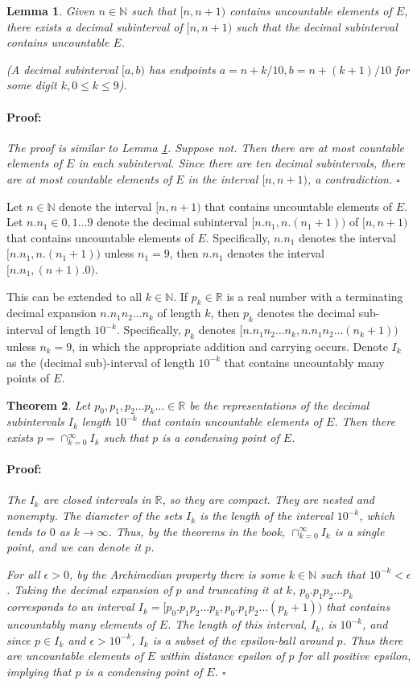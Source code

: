 \documentclass{article}
\newenvironment{proof}{\paragraph{Proof:}}{\hfill$\square$}
\newtheorem{theorem}{Theorem}
\newtheorem{lemma}[theorem]{Lemma}
\newcommand{\N}{\mathbb{N}}
\newcommand{\R}{\mathbb{R}}
\begin{document}
\begin{lemma}
\label{UncountableEInInterval}
Given $n \in \N$ such that $[n, n+1)$ contains uncountable elements of $E$, there exists a decimal subinterval of $[n, n+1)$ such that the decimal subinterval contains uncountable $E$.

(A decimal subinterval $[a, b)$ has endpoints $a = n + k/10, b = n + (k+1)/10$ for some digit $k, 0 \leq k \leq 9$).
\begin{proof}
The proof is similar to Lemma \ref{UncountableEInInterval}. Suppose not. Then there are at most countable elements of $E$ in each subinterval. Since there are ten decimal subintervals, there are at most countable elements of $E$ in the interval $[n, n+1)$, a contradiction.
\end{proof}
\end{lemma}

Let $n \in \N$ denote the interval $[n, n+1)$ that contains uncountable elements of $E$. Let $n.n_1 \in 0, 1 \dots 9$ denote the decimal subinterval $[n.n_1, n.(n_1+1))$ of $[n, n+1)$ that contains uncountable elements of $E$. Specifically, $n.n_1$ denotes the interval $[n.n_1, n.(n_1+1))$ unless $n_1 = 9$, then $n.n_1$ denotes the interval $[n.n_1, (n+1).0)$.

This can be extended to all $k \in \N$. If $p_k \in \R$ is a real number with a terminating decimal expansion $n.n_1n_2 \dots n_k$ of length $k$, then $p_k$ denotes the decimal sub-interval of length $10^{-k}$. Specifically, $p_k$ denotes $[n.n_1n_2 \dots n_k, n.n_1n_2 \dots (n_k+1))$ unless $n_k = 9$, in which the appropriate addition and carrying occurs. Denote $I_k$ as the (decimal sub)-interval of length $10^{-k}$ that contains uncountably many points of $E$.

\begin{theorem}
Let $p_0, p_1, p_2 \dots p_k \dots \in \R$ be the representations of the decimal subintervals $I_k$ length $10^{-k}$ that contain uncountable elements of $E$. Then there exists $p = \cap_{k=0}^\infty I_k$ such that $p$ is a condensing point of $E$.
\begin{proof}
The $I_k$ are closed intervals in $\R$, so they are compact. They are nested and nonempty. The diameter of the sets $I_k$ is the length of the interval $10^{-k}$, which tends to $0$ as $k \rightarrow \infty$. Thus, by the theorems in the book, $\cap_{k=0}^\infty I_k$ is a single point, and we can denote it $p$.

For all $\epsilon > 0$, by the Archimedian property there is some $k \in \N$ such that $10^{-k} < \epsilon$. Taking the decimal expansion of $p$ and truncating it at $k$, $p_0.p_1p_2 \dots p_k$ corresponds to an interval $I_k = [p_0.p_1p_2 \dots p_k, p_0.p_1p_2 \dots (p_k+1))$ that contains uncountably many elements of $E$. The length of this interval, $I_k$, is $10^{-k}$, and since $p \in I_k$ and $\epsilon > 10^{-k}$, $I_k$ is a subset of the epsilon-ball around $p$. Thus there are uncountable elements of $E$ within distance epsilon of $p$ for all positive epsilon, implying that $p$ is a condensing point of $E$.
\end{proof}
\end{theorem}
\end{document}
